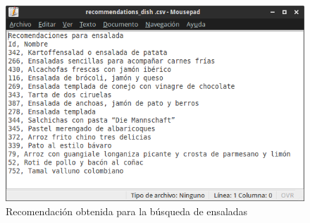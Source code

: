 				\begin{figure}[h!]
					\centering
					\includegraphics[width=16cm]{./images/recommendations_dish}
					\caption{Recomendación obtenida para la búsqueda de ensaladas}
					\label{fig:screenshot2 p2}
				\end{figure}